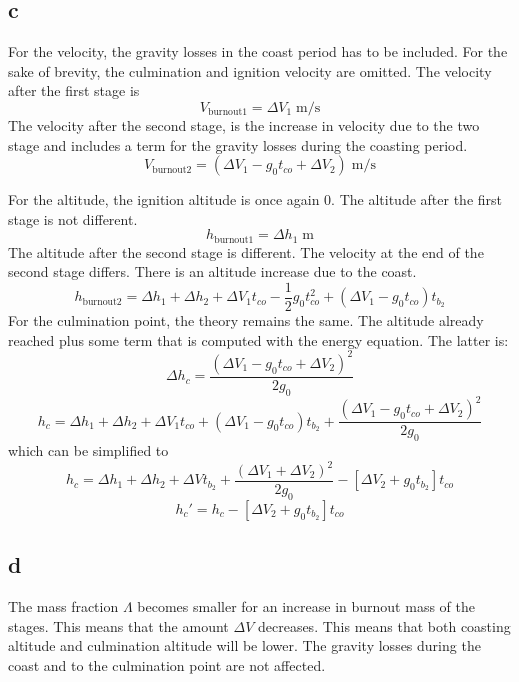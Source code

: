 \subsection{c}
For the velocity, the gravity losses in the coast period has to be included.
For the sake of brevity, the culmination and ignition velocity are omitted. The velocity after the first stage is 
\begin{equation}
V_\text{burnout1} = \Delta V_1\;\text{m/s}
\end{equation}
The velocity after the second stage, is the increase in velocity due to the two stage and includes a term for the gravity losses during the coasting period.
\begin{equation}
V_\text{burnout2} = (\Delta V_1-g_0t_{co}+\Delta V_2)\;\text{m/s}
\end{equation}

For the altitude, the ignition altitude is once again 0. The altitude after the first stage is not different.
\begin{equation}
h_\text{burnout1} = \Delta h_1\;\text{m}
\end{equation}
The altitude after the second stage is different. The velocity at the end of the second stage differs. There is an altitude increase due to the coast.
\begin{equation}
h_\text{burnout2} = \Delta h_1 + \Delta h_2 + \Delta V_1t_{co}-\frac{1}{2}g_0t_{co}^2+(\Delta V_1-g_0t_{co})t_{b_2}
\end{equation}
For the culmination point, the theory remains the same. The altitude already reached plus some term that is computed with the energy equation. The latter is:
\begin{equation}
\Delta h_c = \frac{(\Delta V_1-g_0t_{co}+\Delta V_2)^2}{2g_0}
\end{equation}
\begin{equation}
h_c =  \Delta h_1 + \Delta h_2 + \Delta V_1t_{co}+(\Delta V_1-g_0t_{co})t_{b_2} + \frac{(\Delta V_1-g_0t_{co}+\Delta V_2)^2}{2g_0}
\end{equation}
which can be simplified to
\begin{equation}
h_c = \Delta h_1 +\Delta h_2 + \Delta Vt_{b_2}+\frac{(\Delta V_1+\Delta V_2)^2}{2g_0}-[\Delta V_2 + g_0t_{b_2}]t_{co}
\end{equation}
\begin{equation}
h_c' = h_c -[\Delta V_2 + g_0t_{b_2}]t_{co}
\end{equation}

\subsection{d}
The mass fraction $\Lambda$ becomes smaller for an increase in burnout mass of the stages. This means that the amount $\Delta V$ decreases. This means that both coasting altitude and culmination altitude will be lower. The gravity losses during the coast and to the culmination point are not affected.


